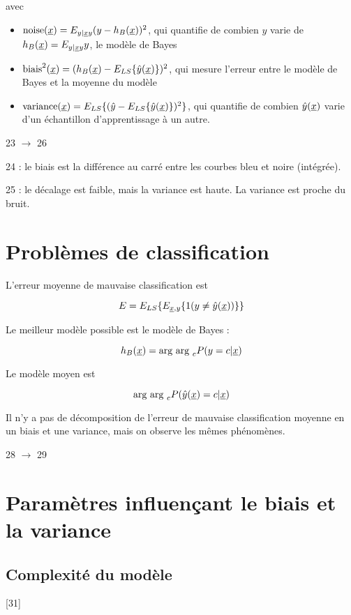	avec
	
	\begin{itemize}
		\item $\text{noise}(\underline{x}) = E_{y \vert \underline{x}y}{(y - h_B(\underline{x}))^2}$, qui quantifie de combien $y$ varie de $h_B(\underline{x}) = E_{y \vert \underline{x}y}{y}$, le modèle de Bayes
		\item $\text{biais}^2(\underline{x}) = (h_B(\underline{x}) - E_{LS}\{\hat{y}(\underline{x})\})^2$, qui mesure l'erreur entre le modèle de Bayes et la moyenne du modèle
		\item $\text{variance}(\underline{x}) = E_{LS}\{(\hat{y} - E_{LS}\{\hat{y}(\underline{x})\})^2\}$, qui quantifie de combien $\hat{y}(\underline{x})$ varie d'un échantillon d'apprentissage à un autre.
	\end{itemize}
	
	23 $\rightarrow$ 26
	
	24 : le biais est la différence au carré entre les courbes bleu et noire (intégrée).
	
	25 : le décalage est faible, mais la variance est haute. La variance est proche du bruit.
	
	
	\section{Problèmes de classification}
	
	L'erreur moyenne de mauvaise classification est
	
	$$E = E_{LS}\{E_{\underline{x}, y}\{1 (y \neq \hat{y}(\underline{x}))\}\}$$
	
	Le meilleur modèle possible est le modèle de Bayes :
	
	$$h_B(\underline{x}) = \text{arg } \text{arg }_c P(y = c \vert \underline{x})$$
	
	Le modèle moyen est
	
	$$\text{arg } \text{arg }_c P(\hat{y}(\underline{x}) = c \vert \underline{x})$$
	
	Il n'y a pas de décomposition de l'erreur de mauvaise classification moyenne en un biais et une variance, mais on observe les mêmes phénomènes.
	
	28 $\rightarrow$ 29
	
	\section{Paramètres influençant le biais et la variance}
	
		\subsection{Complexité du modèle}
		[31]
		
